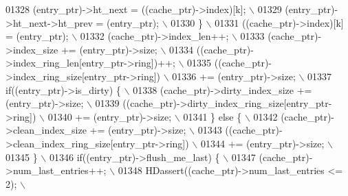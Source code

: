 \begin{DoxyCode}
01328 \textcolor{preprocessor}{        (entry\_ptr)->ht\_next = ((cache\_ptr)->index)[k];                      \(\backslash\)}
01329 \textcolor{preprocessor}{        (entry\_ptr)->ht\_next->ht\_prev = (entry\_ptr);                         \(\backslash\)}
01330 \textcolor{preprocessor}{    \}                                                                        \(\backslash\)}
01331 \textcolor{preprocessor}{    ((cache\_ptr)->index)[k] = (entry\_ptr);                                   \(\backslash\)}
01332 \textcolor{preprocessor}{    (cache\_ptr)->index\_len++;                                                \(\backslash\)}
01333 \textcolor{preprocessor}{    (cache\_ptr)->index\_size += (entry\_ptr)->size;                            \(\backslash\)}
01334 \textcolor{preprocessor}{    ((cache\_ptr)->index\_ring\_len[entry\_ptr->ring])++;                        \(\backslash\)}
01335 \textcolor{preprocessor}{    ((cache\_ptr)->index\_ring\_size[entry\_ptr->ring])                          \(\backslash\)}
01336 \textcolor{preprocessor}{            += (entry\_ptr)->size;                                            \(\backslash\)}
01337 \textcolor{preprocessor}{    if((entry\_ptr)->is\_dirty) \{                                              \(\backslash\)}
01338 \textcolor{preprocessor}{        (cache\_ptr)->dirty\_index\_size += (entry\_ptr)->size;                  \(\backslash\)}
01339 \textcolor{preprocessor}{        ((cache\_ptr)->dirty\_index\_ring\_size[entry\_ptr->ring])                \(\backslash\)}
01340 \textcolor{preprocessor}{                += (entry\_ptr)->size;                                        \(\backslash\)}
01341 \textcolor{preprocessor}{    \} else \{                                                                 \(\backslash\)}
01342 \textcolor{preprocessor}{        (cache\_ptr)->clean\_index\_size += (entry\_ptr)->size;                  \(\backslash\)}
01343 \textcolor{preprocessor}{        ((cache\_ptr)->clean\_index\_ring\_size[entry\_ptr->ring])                \(\backslash\)}
01344 \textcolor{preprocessor}{                += (entry\_ptr)->size;                                        \(\backslash\)}
01345 \textcolor{preprocessor}{    \}                                                                        \(\backslash\)}
01346 \textcolor{preprocessor}{    if((entry\_ptr)->flush\_me\_last) \{                                         \(\backslash\)}
01347 \textcolor{preprocessor}{        (cache\_ptr)->num\_last\_entries++;                                     \(\backslash\)}
01348 \textcolor{preprocessor}{        HDassert((cache\_ptr)->num\_last\_entries <= 2);                        \(\backslash\)}

\end{DoxyCode}
